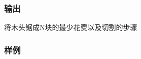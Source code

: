 \documentclass[UTF8]{ctexart}
\begin{document}
	\subsubsection{输出}
    将木头锯成N块的最少花费以及切割的步骤

	\subsubsection{样例}
\end{document}
